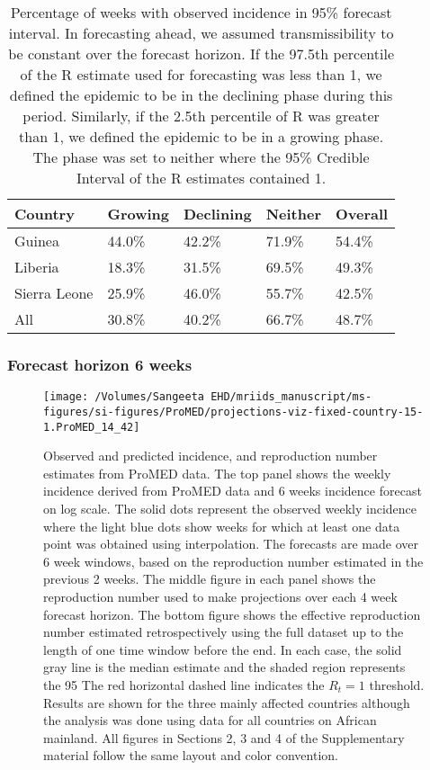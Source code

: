 \documentclass[11pt,]{article}
\begin{document}
\begin{table}
  \centering
  \caption{Percentage of weeks with observed incidence in 95\% forecast
    interval. In forecasting ahead, we assumed transmissibility to be
    constant over the forecast horizon. If the 97.5th percentile of the R
    estimate used for forecasting was less than 1, we defined the epidemic
    to be in the declining phase during this period. Similarly, if the 2.5th
    percentile of R was greater than 1, we defined the epidemic to be in a
    growing phase. The phase was set to neither where the 95\% Credible
    Interval of the R estimates contained 1.}
  \label{tab:propinci}
  \begin{tabular}{lllll}
    \toprule
    Country  & Growing & Declining & Neither & Overall \\
    \midrule
    Guinea  & 44.0\% & 42.2\% & 71.9\% & 54.4\% \\
    Liberia & 18.3\% & 31.5\% & 69.5\% & 49.3\% \\
    Sierra Leone & 25.9\% & 46.0\% & 55.7\% & 42.5\% \\
    All & 30.8\% & 40.2\% & 66.7\% & 48.7\% \\
    \bottomrule
  \end{tabular}
\end{table}


\hypertarget{forecast-horizon-6-weeks}{%
  \subsubsection{Forecast horizon 6 weeks}\label{forecast-horizon-6-weeks}}

\begin{figure}
  \centering
  \texttt{[image: /Volumes/Sangeeta EHD/mriids\_manuscript/ms-figures/si-figures/ProMED/projections-viz-fixed-country-15-1.ProMED\_14\_42]} 
  \caption{Observed and predicted
    incidence, and reproduction number estimates from ProMED data.
    The top panel shows the weekly incidence derived from ProMED
    data and 6 weeks incidence forecast on log scale.
    The solid dots represent the observed weekly incidence where
    the light blue dots show
    weeks for which at least one data point was obtained using
    interpolation. The forecasts are made over 6 week windows, based on the
    reproduction number estimated in the previous 2 weeks.
    The middle figure in each panel shows the reproduction number
    used to make projections over each 4 week forecast horizon.
    The bottom figure shows the effective reproduction number estimated
    retrospectively using the full dataset up to the length of one time window before the end.
    In each case, the solid gray line is the median
    estimate and the shaded region represents the 95%
    The red horizontal dashed line indicates the $R_t = 1$ threshold.
    Results are shown for the three mainly affected countries although the
    analysis was done using data for all countries on African mainland.
    All figures in Sections 2, 3 and 4 of the Supplementary material follow
    the same layout and color convention. }
  \label{fig:pm26}
\end{figure}
\end{document}
